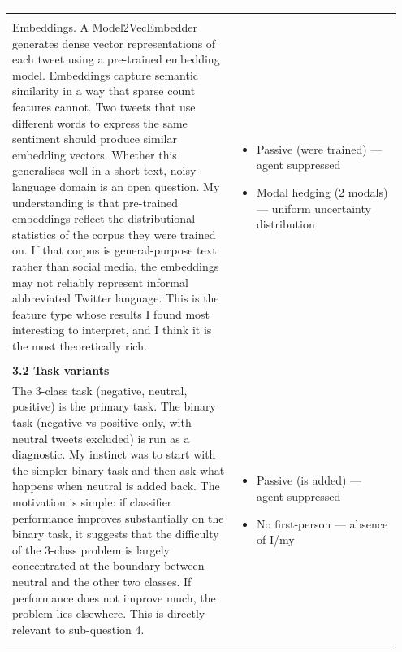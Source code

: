 \documentclass[11pt]{article}
\begin{document}
\begin{longtable}{|p{0.55\linewidth}|p{0.40\linewidth}|}
\begin{itemize}[leftmargin=1em,itemsep=1pt,topsep=1pt,parsep=0pt]
\end{itemize} \\[2pt]
\hline
\rule[-3.5cm]{0pt}{3.5cm} & \\
\hline
Embeddings. A Model2VecEmbedder generates dense vector representations of each tweet using a pre-trained embedding model. Embeddings capture semantic similarity in a way that sparse count features cannot. Two tweets that use different words to express the same sentiment should produce similar embedding vectors. Whether this generalises well in a short-text, noisy-language domain is an open question. My understanding is that pre-trained embeddings reflect the distributional statistics of the corpus they were trained on. If that corpus is general-purpose text rather than social media, the embeddings may not reliably represent informal abbreviated Twitter language. This is the feature type whose results I found most interesting to interpret, and I think it is the most theoretically rich. & \begin{itemize}[leftmargin=1em,itemsep=1pt,topsep=1pt,parsep=0pt]
  \item Passive (were trained) --- agent suppressed
  \item Modal hedging (2 modals) --- uniform uncertainty distribution
\end{itemize} \\[2pt]
\hline
\rule[-3.5cm]{0pt}{3.5cm} & \\
\hline
\textbf{3.2 Task variants}\\[4pt]
The 3-class task (negative, neutral, positive) is the primary task. The binary task (negative vs positive only, with neutral tweets excluded) is run as a diagnostic. My instinct was to start with the simpler binary task and then ask what happens when neutral is added back. The motivation is simple: if classifier performance improves substantially on the binary task, it suggests that the difficulty of the 3-class problem is largely concentrated at the boundary between neutral and the other two classes. If performance does not improve much, the problem lies elsewhere. This is directly relevant to sub-question 4. & \begin{itemize}[leftmargin=1em,itemsep=1pt,topsep=1pt,parsep=0pt]
  \item Passive (is added) --- agent suppressed
  \item No first-person --- absence of I/my
\end{itemize} \\[2pt]
\hline
\rule[-3.5cm]{0pt}{3.5cm} & \\

\end{longtable}
\end{document}
